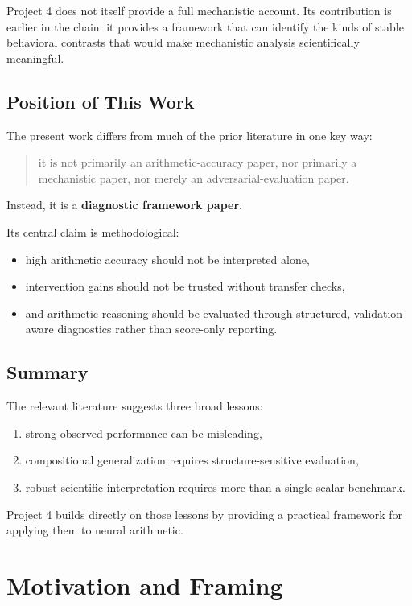 \documentclass[11pt]{article}
\begin{document}
Project 4 does not itself provide a full mechanistic account. Its contribution is earlier in the chain: it provides a framework that can identify the kinds of stable behavioral contrasts that would make mechanistic analysis scientifically meaningful.

\subsection{Position of This Work}

The present work differs from much of the prior literature in one key way:

\begin{quote}
it is not primarily an arithmetic-accuracy paper, nor primarily a mechanistic paper, nor merely an adversarial-evaluation paper.
\end{quote}

Instead, it is a \textbf{diagnostic framework paper}.

Its central claim is methodological:
\begin{itemize}[leftmargin=1.5em]
    \item high arithmetic accuracy should not be interpreted alone,
    \item intervention gains should not be trusted without transfer checks,
    \item and arithmetic reasoning should be evaluated through structured, validation-aware diagnostics rather than score-only reporting.
\end{itemize}

\subsection{Summary}

The relevant literature suggests three broad lessons:
\begin{enumerate}[leftmargin=1.5em]
    \item strong observed performance can be misleading,
    \item compositional generalization requires structure-sensitive evaluation,
    \item robust scientific interpretation requires more than a single scalar benchmark.
\end{enumerate}

Project 4 builds directly on those lessons by providing a practical framework for applying them to neural arithmetic.

\section{Motivation and Framing}
\end{document}
